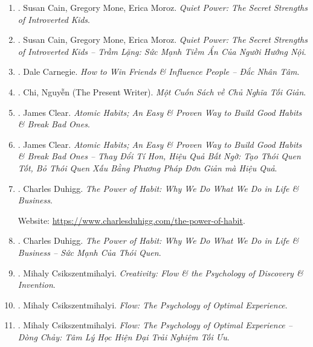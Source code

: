\documentclass{article}
\begin{document}
\begin{enumerate}
	\item \cite{Cain_Mone_Moroz_quiet_power}. Susan Cain, Gregory Mone, Erica Moroz. {\it Quiet Power: The Secret Strengths of Introverted Kids}.\hfill{\sf[reading]}
	
	\item \cite{Cain_Mone_Moroz_quiet_power_VN}. Susan Cain, Gregory Mone, Erica Moroz. {\it Quiet Power: The Secret Strengths of Introverted Kids -- Trầm Lặng: Sức Mạnh Tiềm Ẩn Của Người Hướng Nội}.\hfill{\sf[done]}
	
	\item \cite{Carnegie2021}. Dale Carnegie. {\it How to Win Friends \& Influence People -- Đắc Nhân Tâm}.\hfill{\sf[done]}
	
	\item \cite{Chi2022}. Chi, Nguyễn (The Present Writer). {\it Một Cuốn Sách về Chủ Nghĩa Tối Giản}. \hfill{\sf[done]}
	
	\item \cite{Clear_habit}. James Clear. {\it Atomic Habits; An Easy \& Proven Way to Build Good Habits \& Break Bad Ones}.\hfill{\sf[reading]}
	
	\item \cite{Clear_habit_VN}. James Clear. {\it Atomic Habits; An Easy \& Proven Way to Build Good Habits \& Break Bad Ones -- Thay Đổi Tí Hon, Hiệu Quả Bất Ngờ: Tạo Thói Quen Tốt, Bỏ Thói Quen Xấu Bằng Phương Pháp Đơn Giản mà Hiệu Quả}.\hfill{\sf[done]}
	
	\item \cite{Duhigg_habit}. {\sc Charles Duhigg}. {\it The Power of Habit: Why We Do What We Do in Life \& Business}.
	
	Website: \url{https://www.charlesduhigg.com/the-power-of-habit}.
	
	\item \cite{Duhigg_habit_VN}. {\sc Charles Duhigg}. {\it The Power of Habit: Why We Do What We Do in Life \& Business -- Sức Mạnh Của Thói Quen}.\hfill{\sf[done]}
	
	\item \cite{Csikszentmihalyi_creativity}. {\sc Mihaly Csikszentmihalyi}. {\it Creativity: Flow \& the Psychology of Discovery \& Invention}.\hfill{\sf[reading]}
	
	\item \cite{Csikszentmihalyi_flow}. {\sc Mihaly Csikszentmihalyi}. {\it Flow: The Psychology of Optimal Experience}.\hfill{\sf[reading]}
	
	\item \cite{Csikszentmihalyi_flow_VN}. {\sc Mihaly Csikszentmihalyi}. {\it Flow: The Psychology of Optimal Experience -- Dòng Chảy: Tâm Lý Học Hiện Đại Trải Nghiệm Tối Ưu}.\hfill{\sf[done]}
	

\end{enumerate}
\end{document}
